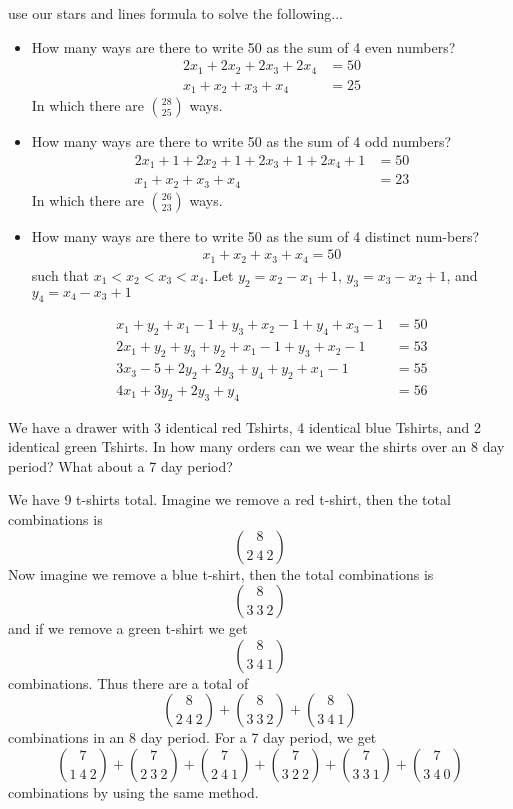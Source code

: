 \documentclass[12pt]{article}
\newenvironment{exercise}[2][Exercise]{\begin{trivlist}
\item[\hskip \labelsep {\bfseries #1} \hskip \labelsep {\bfseries #2.}]}{\end{trivlist}}
\begin{document}
\begin{exercise}{Monday 10 (2pt)}
	use our stars and lines formula to solve the following...
	\begin{itemize}
		\item[(a)] How many ways are there to write 50 as the sum of 4 even numbers?
			\begin{align*}
				2x_1 + 2x_2 + 2x_3 + 2x_4 &= 50 \\
				x_1 + x_2 + x_3 + x_4 &= 25
			\end{align*}
			In which there are $\binom{28}{25}$ ways.
		\item[(b)] How many ways are there to write 50 as the sum of 4 odd numbers?
			\begin{align*}
				2x_1 + 1 + 2x_2 + 1 + 2x_3 + 1 + 2x_4 + 1 &= 50 \\
				x_1 + x_2 + x_3 + x_4 &= 23
			\end{align*}
			In which there are $\binom{26}{23}$ ways.
		\item[(c)] How many ways are there to write 50 as the sum of 4 distinct num-bers?
			\begin{align*}
				x_1 + x_2 + x_3 + x_4 = 50
			\end{align*}
			such that $x_1 < x_2 < x_3 < x_4$. Let $y_2 = x_2 - x_1 + 1$, $y_3 = x_3 - x_2 + 1$, and $y_4 = x_4 - x_3 + 1$

			\begin{align*}
				x_1 + y_2 + x_1 - 1 + y_3 + x_2 - 1 + y_4 + x_3 - 1 &= 50 \\
				2x_1 + y_2 + y_3 + y_2 + x_1 - 1 + y_3 + x_2 - 1 &= 53 \\
				3x_3 - 5 + 2y_2 + 2y_3 + y_4 + y_2 + x_1 - 1 &= 55 \\
				4x_1 + 3y_2 + 2y_3 + y_4 &= 56
			\end{align*}
	\end{itemize}
\end{exercise}
\begin{exercise}{Wednesday 5 (1pt)}
	We have a drawer with 3 identical red Tshirts, 4 identical blue Tshirts,
and 2 identical green Tshirts. In how many orders can we wear the shirts
over an 8 day period? What about a 7 day period?	
\end{exercise}	
We have 9 t-shirts total. Imagine we remove a red t-shirt, then the total combinations is
\[
	\binom{8}{2~4~2}
\]
Now imagine we remove a blue t-shirt, then the total combinations is
\[
	\binom{8}{3~3~2}
\]
and if we remove a green t-shirt we get
\[
	\binom{8}{3~4~1}
\]
combinations. Thus there are a total of
\[
	\binom{8}{2~4~2} + \binom{8}{3~3~2} + \binom{8}{3~4~1}
\]
combinations in an 8 day period. For a 7 day period, we get
\[
	\binom{7}{1~4~2} + \binom{7}{2~3~2} + \binom{7}{2~4~1} + \binom{7}{3~2~2} + \binom{7}{3~3~1} + \binom{7}{3~4~0}
\]
combinations by using the same method.
\end{document}
